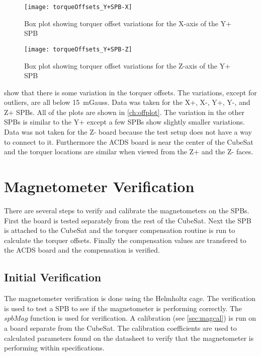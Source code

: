 \begin{figure}[!htb]
    \centering
    \texttt{[image: torqueOffsets\_Y+SPB-X]}
    \caption{Box plot showing torquer offset variations for the X-axis of the Y+ SPB}
    \label{fig:tqoff1}
\end{figure}

\begin{figure}[!htb]
    \centering
    \texttt{[image: torqueOffsets\_Y+SPB-Z]}
    \caption{Box plot showing torquer offset variations for the Z-axis of the Y+ SPB}
    \label{fig:tqoff2}
\end{figure}

 show that there is some variation in the torquer offsets. The variations, except for outliers, are all below \textpm{}15~mGauss. Data was taken for the X+, X-, Y+, Y-, and Z+ \acp{SPB}. All of the plots are shown in \cref{ch:offplot}. The variation in the other \acp{SPB} is similar to the Y+ except a few \acp{SPB} show slightly smaller variations. Data was not taken for the Z- board because the test setup does not have a way to connect to it. Furthermore the \ac{ACDS} board is near the center of the CubeSat and the torquer locations are similar when viewed from the Z+ and the Z- faces.

\section{Magnetometer Verification}

There are several steps to verify and calibrate the magnetometers on the \acp{SPB}. First the board is tested separately from the rest of the CubeSat. Next the \ac{SPB} is attached to the CubeSat and the torquer compensation routine is run to calculate the torquer offsets. Finally the compensation values are transfered to the \ac{ACDS} board and the compensation is verified.


\subsection{Initial Verification}

The magnetometer verification is done using the Helmholtz cage. The verification is used to test a \ac{SPB} to see if the magnetometer is performing correctly. The \lstMat$spbMag$ function is used for verification. A calibration (see \cref{sec:magcal}) is run on a board separate from the CubeSat. The calibration coefficients are used to calculated parameters found on the datasheet to verify that the magnetometer is performing within specifications.

